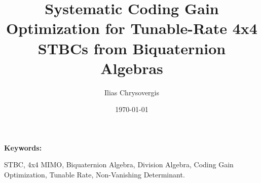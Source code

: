\documentclass[10pt,twocolumn]{article}
\title{Systematic Coding Gain Optimization for Tunable-Rate 4x4 STBCs from Biquaternion Algebras}
\author{Ilias Chrysovergis}
\date{\today}
\newenvironment{IEEEkeywords}{%
    \vspace{0.5em}
    \noindent\textbf{Keywords:} 
}{}
\begin{document}
\maketitle



\begin{IEEEkeywords}
STBC, 4x4 MIMO, Biquaternion Algebra, Division Algebra, Coding Gain Optimization, Tunable Rate, Non-Vanishing Determinant.
\end{IEEEkeywords}












\end{document}
